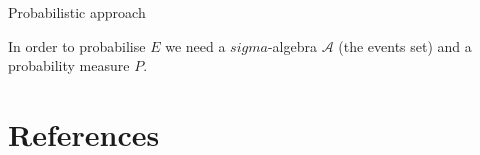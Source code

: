 \documentclass[xcolor=pdftex,dvipsnames,table,mathserif]{beamer}
\begin{document}
\begin{frame}{Probabilistic approach}

  In order to probabilise $E$ we need a $sigma$-algebra $\mathcal{A}$ (the events set) and a probability measure $P$.



\end{frame}




\section*{References}


\end{document}
